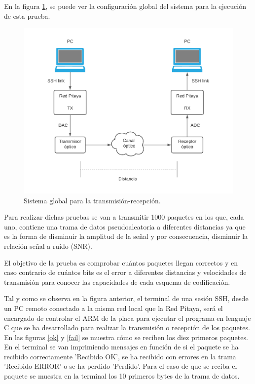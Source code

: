 En la figura \ref{global}, se puede ver la configuración global del sistema para la 
ejecución de esta prueba. 

\begin{figure}[ht]
    \centering
    \includegraphics[scale=0.73]{./figuras/sistema_global.pdf}
    \caption{\small{Sistema global para la transmisión-recepción.}}
    \label{global}%
\end{figure}

Para realizar dichas pruebas se van a transmitir 1000 paquetes en los que, cada uno, 
contiene una trama de datos pseudoaleatoria a diferentes distancias ya que es la 
forma de disminuir la amplitud de la señal y por consecuencia, disminuir la 
relación señal a ruido (SNR).

El objetivo de la prueba es comprobar cuántos paquetes llegan correctos y en caso 
contrario de cuántos bits es el error a diferentes distancias y velocidades de 
transmisión para conocer las capacidades de cada esquema de codificación.

Tal y como se observa en la figura anterior, el terminal de una sesión SSH, desde un PC 
remoto conectado a la misma red local que la Red Pitaya, será el encargado de 
controlar el ARM de la placa para ejecutar el programa en lenguaje
C que se ha desarrollado para realizar la transmisión o recepción de los paquetes. 
En las figuras \ref{ok} y \ref{fail} se muestra cómo se reciben los diez primeros 
paquetes. En el terminal se van imprimiendo mensajes en función de
si el paquete se ha recibido correctamente 'Recibido OK', se ha recibido con errores 
en la trama 'Recibido ERROR' o se ha perdido 'Perdido'. Para el caso de que se reciba 
el paquete se muestra en la terminal los 10 primeros bytes de la trama de datos. 

